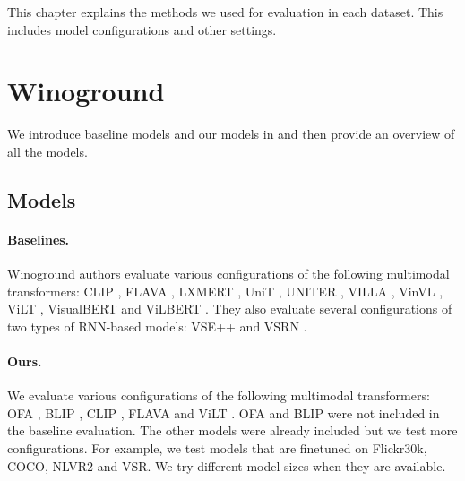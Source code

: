 This chapter explains the methods we used for evaluation in each dataset. This includes model configurations and other settings.

\section{Winoground}

We introduce baseline models and our models in  and then provide an overview of all the models.

\subsection{Models}\label{sec:wino_models}

\paragraph{Baselines.}
Winoground authors \cite{thrush2022winoground} evaluate various configurations of the following multimodal transformers: CLIP \cite{radford2021clip}, FLAVA \cite{singh2022flava}, LXMERT \cite{tan2020lxmert}, UniT \cite{hu2021unit}, UNITER \cite{chen2020uniter}, VILLA \cite{gan2020villa}, VinVL \cite{zhang2021vinvl}, ViLT \cite{kim2021vilt}, VisualBERT \cite{li2019visualbert} and ViLBERT \cite{lu2019vilbert}. They also evaluate several configurations of two types of RNN-based models: VSE++ \cite{faghri2018vse} and VSRN \cite{li2019vsrn}.

\paragraph{Ours.}
We evaluate various configurations of the following multimodal transformers: OFA \cite{wang2022unifying}, BLIP \cite{li2022blip}, CLIP \cite{radford2021clip}, FLAVA \cite{singh2022flava} and ViLT \cite{kim2021vilt}. OFA and BLIP were not included in the baseline evaluation. The other models were already included but we test more configurations. For example, we test models that are finetuned on Flickr30k, COCO, NLVR2 and VSR. We try different model sizes when they are available.

